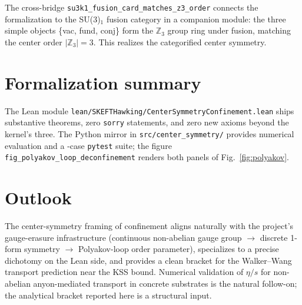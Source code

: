 \documentclass[twocolumn]{revtex4-2}
\newcommand{\KSS}{\eta/s}
\begin{document}
The cross-bridge \texttt{su3k1\_fusion\_card\_matches\_z3\_order}
connects the formalization to the SU(3)$_1$ fusion category in a
companion module: the three simple objects \{vac, fund, conj\} form
the $\mathbb{Z}_3$ group ring under fusion, matching the center order
$|\mathbb{Z}_3| = 3$. This realizes the categorified center symmetry.

\section{Formalization summary}
\label{sec:formalization}

The Lean module
\texttt{lean/SKEFTHawking/CenterSymmetryConfinement.lean} ships \centerSymmThms{}
substantive theorems, zero \texttt{sorry} statements, and zero new
axioms beyond the kernel's three. The Python mirror in
\texttt{src/center\_symmetry/} provides numerical evaluation and a
\centerSymmTests{}-case \texttt{pytest} suite; the figure
\texttt{fig\_polyakov\_loop\_deconfinement} renders both panels of
Fig.~\ref{fig:polyakov}.

\section{Outlook}
\label{sec:outlook}

The center-symmetry framing of confinement aligns naturally with the
project's gauge-erasure infrastructure (continuous non-abelian gauge
group $\to$ discrete 1-form symmetry $\to$ Polyakov-loop order
parameter), specializes to a precise dichotomy on the Lean side, and
provides a clean bracket for the Walker--Wang transport prediction
near the KSS bound. Numerical validation of $\KSS$ for non-abelian
anyon-mediated transport in concrete substrates is the natural
follow-on; the analytical bracket reported here is a structural
input.
\end{document}
